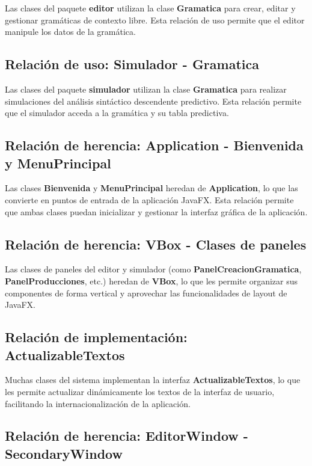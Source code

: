 Las clases del paquete \textbf{editor} utilizan la clase \textbf{Gramatica} para crear, editar y gestionar gramáticas de contexto libre. Esta relación de uso permite que el editor manipule los datos de la gramática.

\subsection{Relación de uso: Simulador - Gramatica}

Las clases del paquete \textbf{simulador} utilizan la clase \textbf{Gramatica} para realizar simulaciones del análisis sintáctico descendente predictivo. Esta relación permite que el simulador acceda a la gramática y su tabla predictiva.

\subsection{Relación de herencia: Application - Bienvenida y MenuPrincipal}

Las clases \textbf{Bienvenida} y \textbf{MenuPrincipal} heredan de \textbf{Application}, lo que las convierte en puntos de entrada de la aplicación JavaFX. Esta relación permite que ambas clases puedan inicializar y gestionar la interfaz gráfica de la aplicación.

\subsection{Relación de herencia: VBox - Clases de paneles}

Las clases de paneles del editor y simulador (como \textbf{PanelCreacionGramatica}, \textbf{PanelProducciones}, etc.) heredan de \textbf{VBox}, lo que les permite organizar sus componentes de forma vertical y aprovechar las funcionalidades de layout de JavaFX.

\subsection{Relación de implementación: ActualizableTextos}

Muchas clases del sistema implementan la interfaz \textbf{ActualizableTextos}, lo que les permite actualizar dinámicamente los textos de la interfaz de usuario, facilitando la internacionalización de la aplicación.

\subsection{Relación de herencia: EditorWindow - SecondaryWindow}

